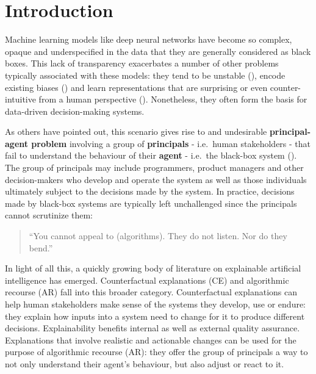 \documentclass[
  letterpaper,
  DIV=11,
  numbers=noendperiod]{scrartcl}
\author{}
\date{}
\begin{document}
\ifdefined\Shaded\renewenvironment{Shaded}{\begin{tcolorbox}[frame hidden, enhanced, sharp corners, boxrule=0pt, interior hidden, borderline west={3pt}{0pt}{shadecolor}, breakable]}{\end{tcolorbox}}\fi

\hypertarget{sec-intro}{%
\section{Introduction}\label{sec-intro}}

Machine learning models like deep neural networks have become so
complex, opaque and underspecified in the data that they are generally
considered as black boxes. This lack of transparency exacerbates a
number of other problems typically associated with these models: they
tend to be unstable (\cite{goodfellow2014explaining}), encode existing
biases (\cite{buolamwini2018gender}) and learn representations that are
surprising or even counter-intuitive from a human perspective
(\cite{sturm2014simple}). Nonetheless, they often form the basis for
data-driven decision-making systems.

As others have pointed out, this scenario gives rise to and undesirable
\textbf{principal-agent problem} involving a group of
\textbf{principals} - i.e.~human stakeholders - that fail to understand
the behaviour of their \textbf{agent} - i.e.~the black-box system
(\cite{borch2022machine}). The group of principals may include
programmers, product managers and other decision-makers who develop and
operate the system as well as those individuals ultimately subject to
the decisions made by the system. In practice, decisions made by
black-box systems are typically left unchallenged since the principals
cannot scrutinize them:

\begin{quote}
``You cannot appeal to (algorithms). They do not listen. Nor do they
bend.'' \cite{oneil2016weapons}
\end{quote}

In light of all this, a quickly growing body of literature on
explainable artificial intelligence has emerged. Counterfactual
explanations (CE) and algorithmic recourse (AR) fall into this broader
category. Counterfactual explanations can help human stakeholders make
sense of the systems they develop, use or endure: they explain how
inputs into a system need to change for it to produce different
decisions. Explainability benefits internal as well as external quality
assurance. Explanations that involve realistic and actionable changes
can be used for the purpose of algorithmic recourse (AR): they offer the
group of principals a way to not only understand their agent's
behaviour, but also adjust or react to it.
\end{document}
